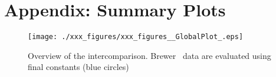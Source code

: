 \section{Appendix: Summary Plots} \label{pag:append}

\vspace{1cm}
\begin{figure}[hbtp!]
\begin{center}   
     \texttt{[image: ./xxx\_figures/xxx\_figures\_\_GlobalPlot\_.eps]}
     \caption{Overview of the intercomparison. Brewer \brwname\ data are evaluated using final constants (blue circles)}
	   \label{fig:GlobalPlot}
\end{center}
\end{figure}

\vspace{1cm}

